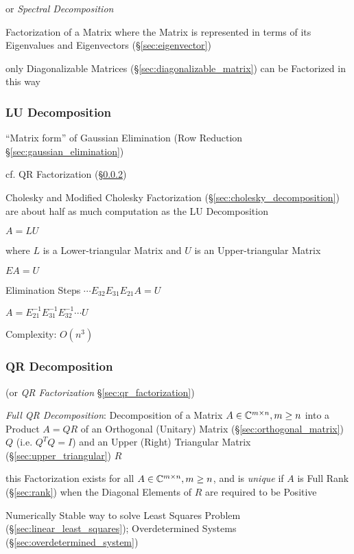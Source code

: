 or \emph{Spectral Decomposition}

Factorization of a Matrix where the Matrix is represented in terms of its
Eigenvalues and Eigenvectors (\S\ref{sec:eigenvector})

only Diagonalizable Matrices (\S\ref{sec:diagonalizable_matrix}) can be
Factorized in this way



\subsubsection{LU Decomposition}\label{sec:lu_decomposition}

``Matrix form'' of Gaussian Elimination (Row Reduction
\S\ref{sec:gaussian_elimination})

cf. QR Factorization (\S\ref{sec:qr_decomposition})

Cholesky and Modified Cholesky Factorization
(\S\ref{sec:cholesky_decomposition}) are about half as much computation as the
LU Decomposition

$A = LU$

where $L$ is a Lower-triangular Matrix and $U$ is an Upper-triangular Matrix

$EA = U$

Elimination Steps $\cdots E_{32}E_{31}E_{21}A = U$

$A = E_{21}^{-1}E_{31}^{-1}E_{32}^{-1}\cdots U$

Complexity: $O(n^3)$



\subsubsection{QR Decomposition}\label{sec:qr_decomposition}

(or \emph{QR Factorization} \S\ref{sec:qr_factorization})

\emph{Full QR Decomposition}: Decomposition of a Matrix $A \in \mathbb{C}^{m \times
  n}, m \geq n$ into a Product $A = QR$ of an Orthogonal (Unitary) Matrix
(\S\ref{sec:orthogonal_matrix}) $Q$ (i.e. $Q^TQ = I$) and an Upper (Right)
Triangular Matrix (\S\ref{sec:upper_triangular}) $R$

this Factorization exists for all $A \in \mathbb{C}^{m \times n}, m \geq n$, and is
\emph{unique} if $A$ is Full Rank (\S\ref{sec:rank}) when the Diagonal Elements
of $R$ are required to be Positive

Numerically Stable way to solve Least Squares Problem
(\S\ref{sec:linear_least_squares}); Overdetermined Systems
(\S\ref{sec:overdetermined_system})

